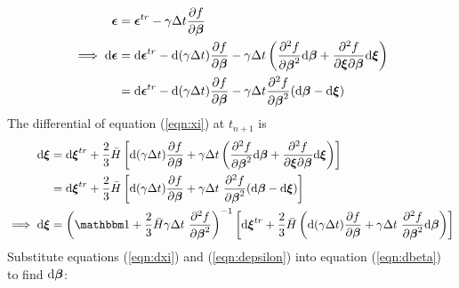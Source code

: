 \documentclass[10pt]{article}
\begin{document}
\begin{equation}
\begin{aligned}
\mbox{\boldmath$\epsilon$} &= \mbox{\boldmath$\epsilon$}^{tr}-\gamma\Delta t
\frac{\partial f}{\partial \mbox{\boldmath$\beta$}}\\
\implies \mathrm{d}\mbox{\boldmath$\epsilon$} &= \mathrm{d}\mbox{\boldmath$\epsilon$}^{tr}
- \mathrm{d}(\gamma\Delta t)
\frac{\partial f}{\partial \mbox{\boldmath$\beta$}}
-\gamma\Delta t
\left(\frac{\partial^2 f}{\partial \mbox{\boldmath$\beta$}^2}
\mathrm{d}\mbox{\boldmath$\beta$}
+\frac{\partial^2 f}{\partial \mbox{\boldmath$\xi$} \partial \mbox{\boldmath$\beta$}}
\mathrm{d}\mbox{\boldmath$\xi$}\right)\\
&= \mathrm{d}\mbox{\boldmath$\epsilon$}^{tr}
- \mathrm{d}(\gamma\Delta t)
\frac{\partial f}{\partial \mbox{\boldmath$\beta$}}
-\gamma\Delta t
\frac{\partial^2 f}{\partial \mbox{\boldmath$\beta$}^2}
(\mathrm{d}\mbox{\boldmath$\beta$}
- \mathrm{d}\mbox{\boldmath$\xi$})
\label{eqn:depsilon}
\end{aligned}
\end{equation}
The differential of equation (\ref{eqn:xi}) at $t_{n+1}$ is
\begin{equation}
\begin{aligned}
\mathrm{d}\Bxi &= \mathrm{d}\Bxi^{tr} + 
\frac{2}{3}\bar{H}\left[
\mathrm{d}(\gamma\Delta t)\frac{\partial f}{\partial\Bbeta}
+ 
\gamma\Delta t\left(
\frac{\partial^2 f}{\partial\Bbeta^2}\mathrm{d}\Bbeta
+ \frac{\partial^2 f}{\partial\Bxi\partial\Bbeta}\mathrm{d}\Bxi\right)
\right]\\
&= \mathrm{d}\Bxi^{tr} + 
\frac{2}{3}\bar{H}\left[
\mathrm{d}(\gamma\Delta t)\frac{\partial f}{\partial\Bbeta}
+ 
\gamma\Delta t\
\frac{\partial^2 f}{\partial\Bbeta^2}
(\mathrm{d}\Bbeta
- \mathrm{d}\Bxi)
\right]\\
\implies
\mathrm{d}\Bxi  &= 
\left(\iso + \frac{2}{3}\bar{H}
\gamma\Delta t\
\frac{\partial^2 f}{\partial\Bbeta^2}
\right)^{-1}
\left[
\mathrm{d}\Bxi^{tr} + 
\frac{2}{3}\bar{H}\left(
\mathrm{d}(\gamma\Delta t)\frac{\partial f}{\partial\Bbeta}
+ 
\gamma\Delta t\
\frac{\partial^2 f}{\partial\Bbeta^2}
\mathrm{d}\Bbeta
\right)\right]
\label{eqn:dxi}
\end{aligned}
\end{equation}
Substitute equations (\ref{eqn:dxi}) and (\ref{eqn:depsilon}) into equation (\ref{eqn:dbeta}) to find $\mathrm{d}\mbox{\boldmath$\beta$}$:
\end{document}
